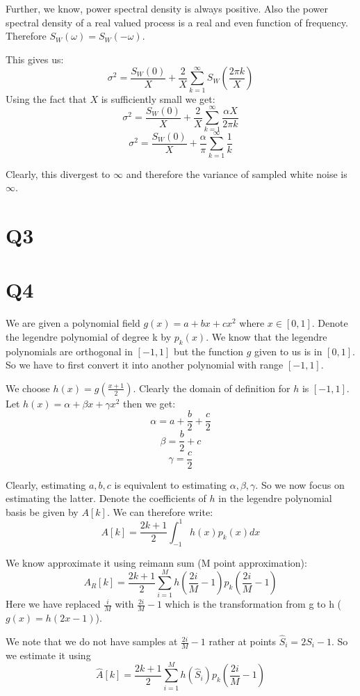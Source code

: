 \documentclass{article}
\begin{document}
Further, we know, power spectral density is always positive. Also the power spectral density of a real valued process is a real and even function of frequency. Therefore $S_W(\omega) = S_W(-\omega)$.

This gives us:
$$\sigma^2 = \frac{S_W(0)}{X} +  \frac{2}{X} \sum_{k=1}^{\infty} S_W(\frac{2 \pi k}{X})$$
Using the fact that $X$ is sufficiently small we get:
$$\sigma^2 = \frac{S_W(0)}{X} +  \frac{2}{X} \sum_{k=1}^{\infty} \frac{\alpha X}{2 \pi k}$$
$$\sigma^2 = \frac{S_W(0)}{X} + \frac{\alpha}{\pi} \sum_{k=1}^{\infty} \frac{1}{k}$$

Clearly, this divergest to $\infty$ and therefore the variance of sampled white noise is $\infty$.

\section*{Q3}

\section*{Q4}
We are given a polynomial field $g(x) = a + bx + cx^2$ where $x \in [0, 1]$. Denote the legendre polynomial of degree k by $p_k(x)$. We know that the legendre polynomials are orthogonal in $[-1, 1]$ but the function $g$ given to  us is in $[0, 1]$. So we have to first convert it into another polynomial with range $[-1, 1]$.

We choose $h(x) = g(\frac{x+1}{2})$. Clearly the domain of definition for $h$ is $[-1, 1]$. Let $h(x) = \alpha + \beta x + \gamma x^2$ then we get:
$$\alpha = a + \frac{b}{2} + \frac{c}{2}$$
$$\beta = \frac{b}{2} + c$$
$$\gamma = \frac{c}{2}$$

Clearly, estimating $a, b, c$ is equivalent to estimating $\alpha, \beta, \gamma$. So we now focus on estimating the latter. Denote the coefficients of $h$ in the legendre polynomial basis be given by $A[k]$. We can therefore write:
$$A[k] = \frac{2k+1}{2} \int_{-1}^1 h(x) p_k(x) dx$$

We know approximate it using reimann sum (M point approximation):
$$A_R[k] = \frac{2k+1}{2} \sum_{i=1}^M h(\frac{2i}{M}-1) p_k(\frac{2i}{M} -1)$$
Here we have replaced $\frac{i}{M}$ with $\frac{2i}{M}-1$ which is the transformation from g to h ($g(x) = h(2x-1)$).

We note that we do not have samples at $\frac{2i}{M} -1$ rather at points $\hat{S}_i = 2 S_i - 1$. So we estimate it using
$$\hat{A}[k] = \frac{2k+1}{2} \sum_{i=1}^M h(\hat{S}_i) p_k(\frac{2i}{M} -1)$$
\end{document}
